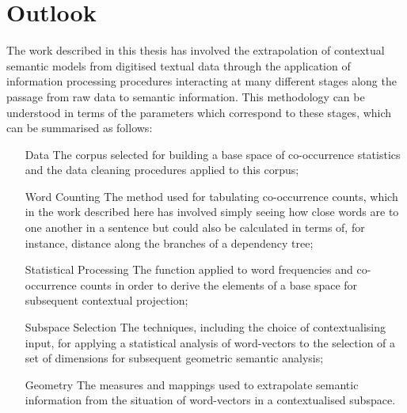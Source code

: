 \section{Outlook}
The work described in this thesis has involved the extrapolation of contextual semantic models from digitised textual data through the application of information processing procedures interacting at many different stages along the passage from raw data to semantic information.  This methodology can be understood in terms of the parameters which correspond to these stages, which can be summarised as follows:

\begin{itemize}
\item[Data] The corpus selected for building a base space of co-occurrence statistics and the data cleaning procedures applied to this corpus;

\item[Word Counting] The method used for tabulating co-occurrence counts, which in the work described here has involved simply seeing how close words are to one another in a sentence but could also be calculated in terms of, for instance, distance along the branches of a dependency tree;

\item[Statistical Processing] The function applied to word frequencies and co-occurrence counts in order to derive the elements of a base space for subsequent contextual projection;

\item[Subspace Selection] The techniques, including the choice of contextualising input, for applying a statistical analysis of word-vectors to the selection of a set of dimensions for subsequent geometric semantic analysis;

\item[Geometry] The measures and mappings used to extrapolate semantic information from the situation of word-vectors in a contextualised subspace.
\end{itemize}


